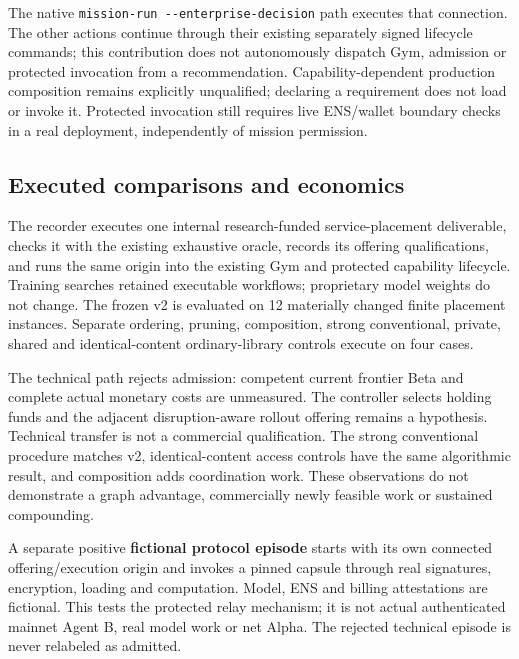 \documentclass[
  10pt,
]{article}
\begin{document}
The native \texttt{mission-run\ -\/-enterprise-decision} path executes
that connection. The other actions continue through their existing
separately signed lifecycle commands; this contribution does not
autonomously dispatch Gym, admission or protected invocation from a
recommendation. Capability-dependent production composition remains
explicitly unqualified; declaring a requirement does not load or invoke
it. Protected invocation still requires live ENS/wallet boundary checks
in a real deployment, independently of mission permission.

\hypertarget{executed-comparisons-and-economics}{%
\subsection{Executed comparisons and
economics}\label{executed-comparisons-and-economics}}

The recorder executes one internal research-funded service-placement
deliverable, checks it with the existing exhaustive oracle, records its
offering qualifications, and runs the same origin into the existing Gym
and protected capability lifecycle. Training searches retained
executable workflows; proprietary model weights do not change. The
frozen v2 is evaluated on 12 materially changed finite placement
instances. Separate ordering, pruning, composition, strong conventional,
private, shared and identical-content ordinary-library controls execute
on four cases.

The technical path rejects admission: competent current frontier Beta
and complete actual monetary costs are unmeasured. The controller
selects holding funds and the adjacent disruption-aware rollout offering
remains a hypothesis. Technical transfer is not a commercial
qualification. The strong conventional procedure matches v2,
identical-content access controls have the same algorithmic result, and
composition adds coordination work. These observations do not
demonstrate a graph advantage, commercially newly feasible work or
sustained compounding.

A separate positive \textbf{fictional protocol episode} starts with its
own connected offering/execution origin and invokes a pinned capsule
through real signatures, encryption, loading and computation. Model, ENS
and billing attestations are fictional. This tests the protected relay
mechanism; it is not actual authenticated mainnet Agent B, real model
work or net Alpha. The rejected technical episode is never relabeled as
admitted.
\end{document}
